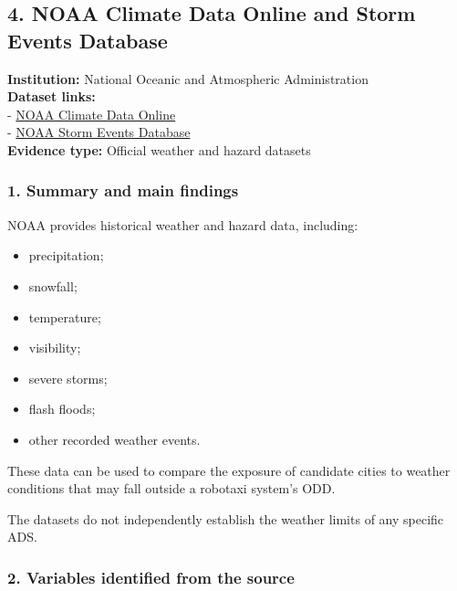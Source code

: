 \documentclass[10pt,a4paper]{article}
\providecommand{\tightlist}{\setlength{\itemsep}{0pt}\setlength{\parskip}{0pt}}
\begin{document}
\hypertarget{noaa-climate-data-online-and-storm-events-database}{%
\subsection{4. NOAA Climate Data Online and Storm Events Database}\label{noaa-climate-data-online-and-storm-events-database}}

\textbf{Institution:} National Oceanic and Atmospheric Administration\\
\textbf{Dataset links:}\\
- \href{https://www.ncei.noaa.gov/cdo-web/}{NOAA Climate Data Online}\\
- \href{https://www.ncei.noaa.gov/access/monitoring/storm-events/}{NOAA Storm Events Database}\\
\textbf{Evidence type:} Official weather and hazard datasets

\hypertarget{summary-and-main-findings-7}{%
\subsubsection{1. Summary and main findings}\label{summary-and-main-findings-7}}

NOAA provides historical weather and hazard data, including:

\begin{itemize}
\tightlist
\item
  precipitation;
\item
  snowfall;
\item
  temperature;
\item
  visibility;
\item
  severe storms;
\item
  flash floods;
\item
  other recorded weather events.
\end{itemize}

These data can be used to compare the exposure of candidate cities to weather conditions that may fall outside a robotaxi system's ODD.

The datasets do not independently establish the weather limits of any specific ADS.

\hypertarget{variables-identified-from-the-source-7}{%
\subsubsection{2. Variables identified from the source}\label{variables-identified-from-the-source-7}}
\end{document}

